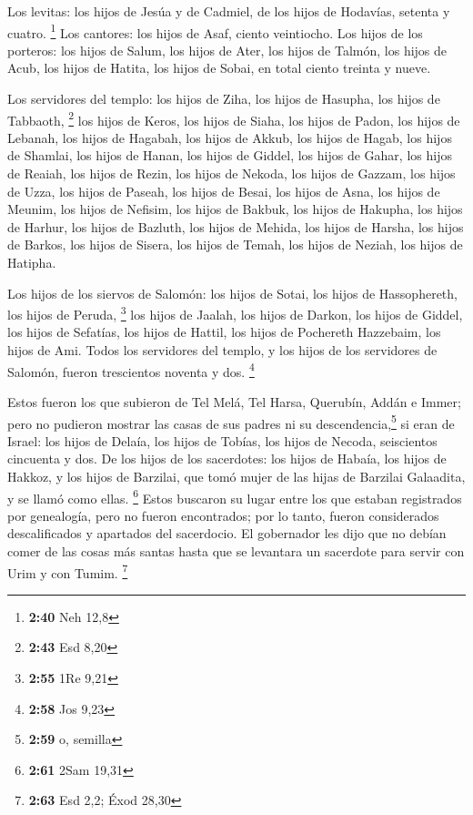  Los levitas: los hijos de Jesúa y de Cadmiel, de los
hijos de Hodavías, setenta y cuatro. \footnote{\textbf{2:40} Neh 12,8}
 Los cantores: los hijos de Asaf, ciento veintiocho.
 Los hijos de los porteros: los hijos de Salum, los hijos
de Ater, los hijos de Talmón, los hijos de Acub, los hijos de Hatita,
los hijos de Sobai, en total ciento treinta y nueve.

 Los servidores del templo: los hijos de Ziha, los hijos
de Hasupha, los hijos de Tabbaoth, \footnote{\textbf{2:43} Esd 8,20}
 los hijos de Keros, los hijos de Siaha, los hijos de
Padon,  los hijos de Lebanah, los hijos de Hagabah, los
hijos de Akkub,  los hijos de Hagab, los hijos de
Shamlai, los hijos de Hanan,  los hijos de Giddel, los
hijos de Gahar, los hijos de Reaiah,  los hijos de Rezin,
los hijos de Nekoda, los hijos de Gazzam,  los hijos de
Uzza, los hijos de Paseah, los hijos de Besai,  los hijos
de Asna, los hijos de Meunim, los hijos de Nefisim,  los
hijos de Bakbuk, los hijos de Hakupha, los hijos de Harhur,
 los hijos de Bazluth, los hijos de Mehida, los hijos de
Harsha,  los hijos de Barkos, los hijos de Sisera, los
hijos de Temah,  los hijos de Neziah, los hijos de
Hatipha.

 Los hijos de los siervos de Salomón: los hijos de Sotai,
los hijos de Hassophereth, los hijos de Peruda, \footnote{\textbf{2:55}
  1Re 9,21}  los hijos de Jaalah, los hijos de Darkon,
los hijos de Giddel,  los hijos de Sefatías, los hijos de
Hattil, los hijos de Pochereth Hazzebaim, los hijos de Ami.
 Todos los servidores del templo, y los hijos de los
servidores de Salomón, fueron trescientos noventa y dos. \footnote{\textbf{2:58}
  Jos 9,23}

 Estos fueron los que subieron de Tel Melá, Tel Harsa,
Querubín, Addán e Immer; pero no pudieron mostrar las casas de sus
padres ni su descendencia,\footnote{\textbf{2:59} o, semilla} si eran de
Israel:  los hijos de Delaía, los hijos de Tobías, los
hijos de Necoda, seiscientos cincuenta y dos.  De los
hijos de los sacerdotes: los hijos de Habaía, los hijos de Hakkoz, y los
hijos de Barzilai, que tomó mujer de las hijas de Barzilai Galaadita, y
se llamó como ellas. \footnote{\textbf{2:61} 2Sam 19,31} 
Estos buscaron su lugar entre los que estaban registrados por
genealogía, pero no fueron encontrados; por lo tanto, fueron
considerados descalificados y apartados del sacerdocio. 
El gobernador les dijo que no debían comer de las cosas más santas hasta
que se levantara un sacerdote para servir con Urim y con Tumim.
\footnote{\textbf{2:63} Esd 2,2; Éxod 28,30}

